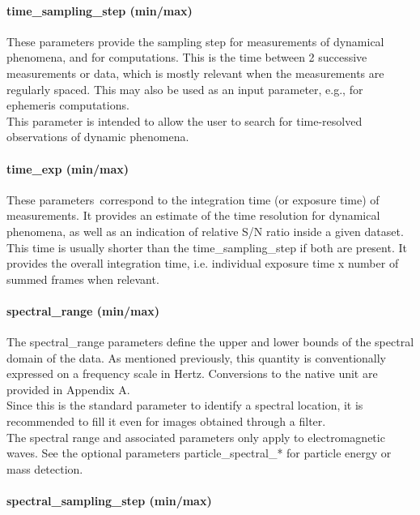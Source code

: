 \documentclass[11pt,a4paper]{ivoa}
\begin{document}
\paragraph{time\_sampling\_step (min/max)}

These parameters provide the sampling step for measurements of dynamical phenomena, and for computations. This is the time between 2 successive measurements or data, which is mostly relevant when the measurements are regularly spaced. This may also be used as an input parameter, e.g., for ephemeris computations. \\ This parameter is intended to allow the user to search for time-resolved observations of dynamic phenomena.

\paragraph{time\_exp (min/max)}

These parameters correspond to the integration time (or exposure time) of measurements. It provides an estimate of the time resolution for dynamical phenomena, as well as an indication of relative S/N ratio inside a given dataset. This time is usually shorter than the time\_sampling\_step if both are present. It provides the overall integration time, i.e. individual exposure time x number of summed frames when relevant. 

\paragraph{spectral\_range (min/max)}

The spectral\_range parameters define the upper and lower bounds of the spectral domain of the data. As mentioned previously, this quantity is conventionally expressed on a frequency scale in Hertz. Conversions to the native unit are provided in Appendix A.\\Since this is the standard parameter to identify a spectral location, it is recommended to fill it even for images obtained through a filter. \\ The spectral range and associated parameters only apply to electromagnetic waves. See the optional parameters particle\_spectral\_* for particle energy or mass detection.

\paragraph{spectral\_sampling\_step (min/max)}
\end{document}
